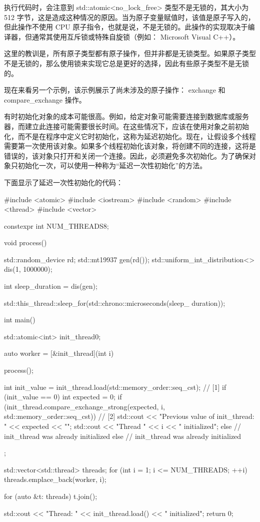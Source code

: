执行代码时，会注意到 std::atomic<no\_lock\_free> 类型不是无锁的，其大小为 512 字节，这是造成这种情况的原因。当为原子变量赋值时，该值是原子写入的，但此操作不使用 CPU 原子指令，也就是说，不是无锁的。此操作的实现取决于编译器，但通常其使用互斥锁或特殊自旋锁（例如： Microsoft Visual C++）。

这里的教训是，所有原子类型都有原子操作，但并非都是无锁类型。如果原子类型不是无锁的，那么使用锁来实现它总是更好的选择，因此有些原子类型不是无锁的。

现在来看另一个示例，该示例展示了尚未涉及的原子操作： exchange 和 compare\_exchange 操作。


有时初始化对象的成本可能很高。例如，给定对象可能需要连接到数据库或服务器，而建立此连接可能需要很长时间。在这些情况下，应该在使用对象之前初始化，而不是在程序中定义它时初始化，这称为延迟初始化。现在，让假设多个线程需要第一次使用该对象。如果多个线程初始化该对象，将创建不同的连接，这将是错误的，该对象只打开和关闭一个连接。因此，必须避免多次初始化。为了确保对象只初始化一次，可以使用一种称为“延迟一次性初始化”的方法。

下面显示了延迟一次性初始化的代码：

\begin{cpp}
#include <atomic>
#include <iostream>
#include <random>
#include <thread>
#include <vector>

constexpr int NUM_THREADS{8};

void process() {
    std::random_device rd;
    std::mt19937 gen(rd());
    std::uniform_int_distribution<> dis(1, 1000000);

    int sleep_duration = dis(gen);

    std::this_thread::sleep_for(std::chrono::microseconds(sleep_
    duration));
}

int main() {
    std::atomic<int> init_thread{0};

    auto worker = [&init_thread](int i) {
        process();

        int init_value = init_thread.load(std::memory_order::seq_cst); // [1]
        if (init_value == 0) {
            int expected = 0;
            if (init_thread.compare_exchange_strong(expected, i,
            std::memory_order::seq_cst)) { // [2]
                std::cout << "Previous value of init_thread: " <<
                expected << "\n";
                std::cout << "Thread " << i << " initialized\n";
            } else {
                // init_thread was already initialized
            }
        } else {
            // init_thread was already initialized
        }
    };

    std::vector<std::thread> threads;
    for (int i = 1; i <= NUM_THREADS; ++i) {
        threads.emplace_back(worker, i);
    }

    for (auto &t: threads) {
        t.join();
    }

    std::cout << "Thread: " << init_thread.load() << " initialized\n";
    return 0;
}
\end{cpp}

